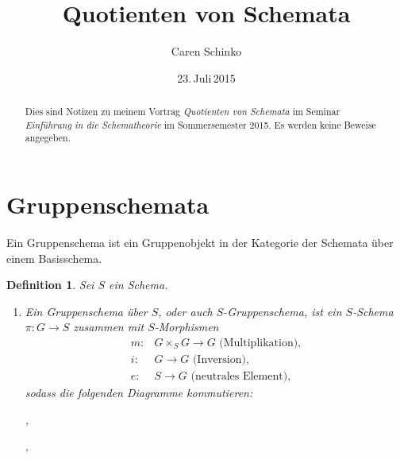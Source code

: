 \documentclass[DIV11,11pt]{scrartcl}
\title{Quotienten von Schemata}
\author{Caren Schinko}
\date{23.\,Juli\,2015}
\theoremstyle{Definitionen}
\newtheorem{Def}{Definition}[section]
\theoremstyle{Aussagen}
\DeclareMathOperator{\id}{id}
\begin{document}
\maketitle
\begin{abstract}
Dies sind Notizen zu meinem Vortrag \textit{Quotienten von Schemata} im Seminar \textit{Einführung in die Schematheorie} im Sommersemester 2015. Es werden keine Beweise angegeben.
\end{abstract}
\tableofcontents


\section{Gruppenschemata}
Ein Gruppenschema ist ein Gruppenobjekt in der Kategorie der Schemata über einem Basisschema.

\begin{Def}\label{Gruppenschema}
Sei $S$ ein Schema.
\begin{enumerate}
\item Ein \textit{Gruppenschema über $S$}, oder auch \textit{$S$-Gruppenschema}, ist ein $S$-Schema $\pi\colon G\rightarrow S$ zusammen mit $S$-Morphismen
\begin{align*}
m\colon &G\times_{S}G\rightarrow G \text{ (Multiplikation),}\\
i\colon &G\rightarrow G \text{ (Inversion),}\\
e\colon &S\rightarrow G \text{ (neutrales Element),}
\end{align*}
sodass die folgenden Diagramme kommutieren:
\begin{center},\end{center}
\begin{center},\end{center}

\end{enumerate}
\end{Def}
\end{document}
